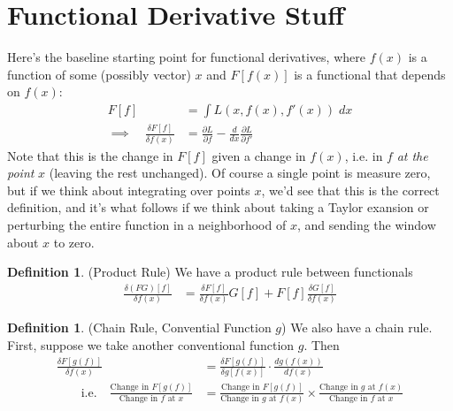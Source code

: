 \documentclass[12pt]{article}
\theoremstyle{plain}
\theoremstyle{definition}
\newtheorem{defn}[thm]{Definition}
\theoremstyle{remark}
\begin{document}
\section{Functional Derivative Stuff}

Here's the baseline starting point for functional derivatives, where
$f(x)$ is a function of some (possibly vector) $x$ and $F[f(x)]$ is a
functional that depends on $f(x)$:
\begin{align*}
  F[f]
  &=\int L(x,f(x),f'(x))\;dx
  \\
  \implies\quad
  \frac{\delta F[f]}{\delta f(x)}
  &=
  \frac{\partial L}{\partial f}
  - \frac{d}{dx} \frac{\partial L}{\partial f'}
\end{align*}
Note that this is the change in $F[f]$ given a change in $f(x)$, i.e. in
$f$ \emph{at the point} $x$ (leaving the rest unchanged).
Of course a single point is measure zero, but if we think about
integrating over points $x$, we'd see that this is the correct
definition, and it's what follows if we think about taking a Taylor
exansion or perturbing the entire function in a neighborhood of $x$, and
sending the window about $x$ to zero.

\begin{defn}(Product Rule)
We have a product rule between functionals
\begin{align*}
  \frac{\delta (FG)[f]}{\delta f(x)}
  &=
  \frac{\delta F[f]}{\delta f(x)}
  G[f]
  +
  F[f]
  \frac{\delta G[f]}{\delta f(x)}
\end{align*}
\end{defn}


\begin{defn}(Chain Rule, Convential Function $g$)
We also have a chain rule.  First, suppose we take another conventional
function $g$. Then
\begin{align*}
  \frac{\delta F[g(f)]}{\delta f(x)}
  &=
  \frac{\delta F[g(f)]}{\delta g[f(x)]}
  \cdot
  \frac{d g(f(x))}{d f(x)}
  \\
  \qquad \text{i.e.}\quad
  \frac{\text{Change in $F[g(f)]$}}{\text{Change in $f$ at $x$}}
  &=
  \frac{\text{Change in $F[g(f)]$}}{\text{Change in $g$ at $f(x)$}}
  \times
  \frac{\text{Change in $g$ at $f(x)$}}{\text{Change in $f$ at $x$}}
\end{align*}
\end{defn}
\end{document}
